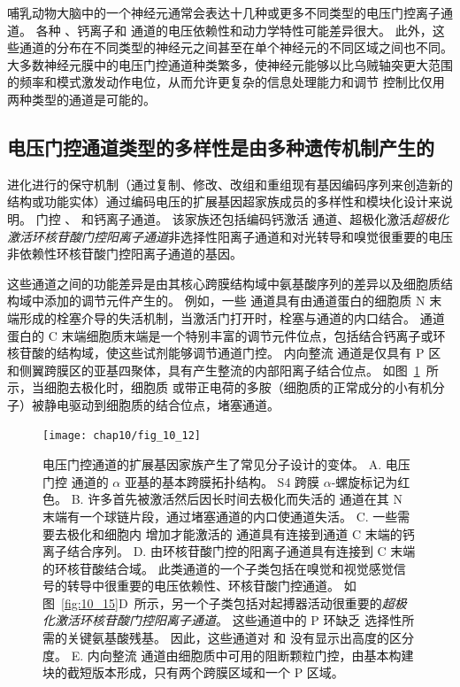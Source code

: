 哺乳动物大脑中的一个神经元通常会表达十几种或更多不同类型的电压门控离子通道。
各种 、钙离子和  通道的电压依赖性和动力学特性可能差异很大。
此外，这些通道的分布在不同类型的神经元之间甚至在单个神经元的不同区域之间也不同。
大多数神经元膜中的电压门控通道种类繁多，使神经元能够以比乌贼轴突更大范围的频率和模式激发动作电位，从而允许更复杂的信息处理能力和调节 控制比仅用两种类型的通道是可能的。



\subsection{电压门控通道类型的多样性是由多种遗传机制产生的}

进化进行的保守机制（通过复制、修改、改组和重组现有基因编码序列来创造新的结构或功能实体）通过编码电压的扩展基因超家族成员的多样性和模块化设计来说明。 
门控 、 和钙离子通道。
该家族还包括编码钙激活  通道、超极化激活\textit{超极化激活环核苷酸门控阳离子通道}非选择性阳离子通道和对光转导和嗅觉很重要的电压非依赖性环核苷酸门控阳离子通道的基因。


这些通道之间的功能差异是由其核心跨膜结构域中氨基酸序列的差异以及细胞质结构域中添加的调节元件产生的。 
例如，一些  通道具有由通道蛋白的细胞质 N 末端形成的栓塞介导的失活机制，当激活门打开时，栓塞与通道的内口结合。
通道蛋白的 C 末端细胞质末端是一个特别丰富的调节元件位点，包括结合钙离子或环核苷酸的结构域，使这些试剂能够调节通道门控。
内向整流  通道是仅具有 P 区和侧翼跨膜区的亚基四聚体，具有产生整流的内部阳离子结合位点。
如图~\ref{fig:10_12}~所示，当细胞去极化时，细胞质  或带正电荷的多胺（细胞质的正常成分的小有机分子）被静电驱动到细胞质的结合位点，堵塞通道。


\begin{figure}[htbp]
	\centering
	\texttt{[image: chap10/fig\_10\_12]}
	\caption{电压门控通道的扩展基因家族产生了常见分子设计的变体。
		A. 电压门控  通道的 $\alpha$ 亚基的基本跨膜拓扑结构。
		S4 跨膜 $\alpha$-螺旋标记为红色。
		B. 许多首先被激活然后因长时间去极化而失活的  通道在其 N 末端有一个球链片段，通过堵塞通道的内口使通道失活。
		C. 一些需要去极化和细胞内  增加才能激活的  通道具有连接到通道 C 末端的钙离子结合序列。
		D. 由环核苷酸门控的阳离子通道具有连接到 C 末端的环核苷酸结合域。
		此类通道的一个子类包括在嗅觉和视觉感觉信号的转导中很重要的电压依赖性、环核苷酸门控通道。
		如图~\ref{fig:10_15}D~所示，另一个子类包括对起搏器活动很重要的\textit{超极化激活环核苷酸门控阳离子通道}。
		这些通道中的 P 环缺乏  选择性所需的关键氨基酸残基。
		因此，这些通道对  和  没有显示出高度的区分度。
		E. 内向整流  通道由细胞质中可用的阻断颗粒门控，由基本构建块的截短版本形成，只有两个跨膜区域和一个 P 区域。}
	\label{fig:10_12}
\end{figure}


